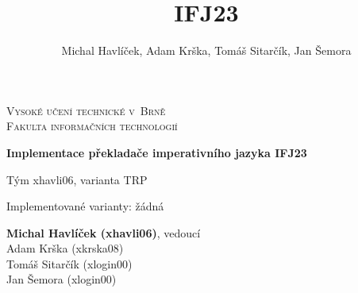 \documentclass[12pt,a4paper]{article}
\author{Michal Havlíček, Adam Krška, Tomáš Sitarčík, Jan Šemora}
\title{IFJ23}
\begin{document}
\makeatletter
\begin{titlepage}
\begin{center}
	{\Huge\textsc{Vysoké učení technické v~Brně}\\[0.4em]
	\LARGE\textsc{Fakulta informačních technologií}}


	{\bfseries\LARGE Implementace překladače imperativního jazyka IFJ23}

	\vspace{1cm}

	{\LARGE Tým xhavli06, varianta TRP}
	\vspace{1cm}

	{\large Implementované varianty: žádná}

	{
		\large
		\textbf{Michal Havlíček (xhavli06)}, vedoucí\\
		Adam Krška (xkrska08)\\
		Tomáš Sitarčík (xlogin00)\\
		Jan Šemora (xlogin00)
	}
\end{center}
\end{titlepage}
\makeatother

\tableofcontents


\end{document}
